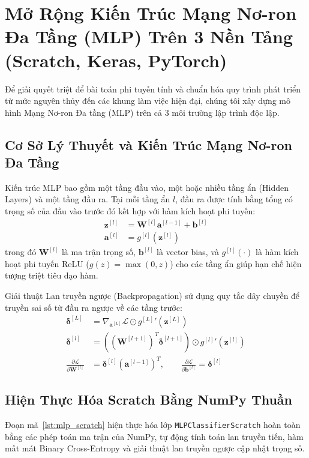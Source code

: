 \documentclass[12pt,a4paper]{report}
\begin{document}
\section{Mở Rộng Kiến Trúc Mạng Nơ-ron Đa Tầng (MLP) Trên 3 Nền Tảng (Scratch, Keras, PyTorch)}

Để giải quyết triệt để bài toán phi tuyến tính và chuẩn hóa quy trình phát triển từ mức nguyên thủy đến các khung làm việc hiện đại, chúng tôi xây dựng mô hình Mạng Nơ-ron Đa tầng (MLP) trên cả 3 môi trường lập trình độc lập.

\subsection{Cơ Sở Lý Thuyết và Kiến Trúc Mạng Nơ-ron Đa Tầng}

Kiến trúc MLP bao gồm một tầng đầu vào, một hoặc nhiều tầng ẩn (Hidden Layers) và một tầng đầu ra. Tại mỗi tầng ẩn $l$, đầu ra được tính bằng tổng có trọng số của đầu vào trước đó kết hợp với hàm kích hoạt phi tuyến:
\begin{align}
\mathbf{z}^{[l]} &= \mathbf{W}^{[l]} \mathbf{a}^{[l-1]} + \mathbf{b}^{[l]} \\
\mathbf{a}^{[l]} &= g^{[l]}\left( \mathbf{z}^{[l]} \right)
\end{align}
trong đó $\mathbf{W}^{[l]}$ là ma trận trọng số, $\mathbf{b}^{[l]}$ là vector bias, và $g^{[l]}(\cdot)$ là hàm kích hoạt phi tuyến ReLU ($g(z) = \max(0, z)$) cho các tầng ẩn giúp hạn chế hiện tượng triệt tiêu đạo hàm.

Giải thuật Lan truyền ngược (Backpropagation) sử dụng quy tắc dây chuyền để truyền sai số từ đầu ra ngược về các tầng trước:
\begin{align}
\boldsymbol{\delta}^{[L]} &= \nabla_{\mathbf{a}^{[L]}} \mathcal{L} \odot {g^{[L]}}'(\mathbf{z}^{[L]}) \\
\boldsymbol{\delta}^{[l]} &= \left( (\mathbf{W}^{[l+1]})^T \boldsymbol{\delta}^{[l+1]} \right) \odot {g^{[l]}}'(\mathbf{z}^{[l]}) \\
\frac{\partial \mathcal{L}}{\partial \mathbf{W}^{[l]}} &= \boldsymbol{\delta}^{[l]} (\mathbf{a}^{[l-1]})^T, \qquad \frac{\partial \mathcal{L}}{\partial \mathbf{b}^{[l]}} = \boldsymbol{\delta}^{[l]}
\end{align}

\subsection{Hiện Thực Hóa Scratch Bằng NumPy Thuần}
Đoạn mã~\ref{lst:mlp_scratch} hiện thực hóa lớp \texttt{MLPClassifierScratch} hoàn toàn bằng các phép toán ma trận của NumPy, tự động tính toán lan truyền tiến, hàm mất mát Binary Cross-Entropy và giải thuật lan truyền ngược cập nhật trọng số.
\end{document}
